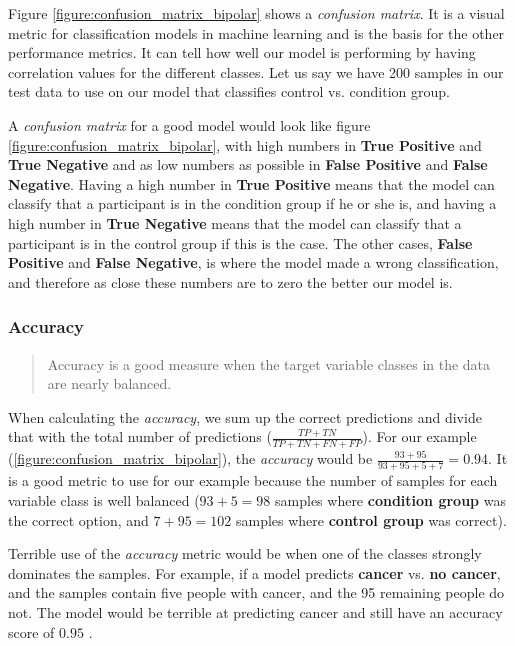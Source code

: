 Figure \ref{figure:confusion_matrix_bipolar} shows a \textit{confusion matrix}. It is a visual metric for classification models in machine learning and is the basis for the other performance metrics. It can tell how well our model is performing by having correlation values for the different classes. Let us say we have 200 samples in our test data to use on our model that classifies control vs. condition group. 

A \textit{confusion matrix} for a good model would look like figure \ref{figure:confusion_matrix_bipolar}, with high numbers in \textbf{True Positive} and \textbf{True Negative} and as low numbers as possible in \textbf{False Positive} and \textbf{False Negative}. Having a high number in \textbf{True Positive} means that the model can classify that a participant is in the condition group if he or she is, and having a high number in \textbf{True Negative} means that the model can classify that a participant is in the control group if this is the case. The other cases, \textbf{False Positive} and \textbf{False Negative}, is where the model made a wrong classification, and therefore as close these numbers are to zero the better our model is.

\subsubsection{Accuracy}

\blockquote[\cite{ml_metrics}]{Accuracy is a good measure when the target variable classes in the data are nearly balanced.}

When calculating the \textit{accuracy}, we sum up the correct predictions and divide that with the total number of predictions ($ \frac{TP + TN}{TP + TN + FN + FP} $). For our example (\ref{figure:confusion_matrix_bipolar}), the \textit{accuracy} would be $ \frac{93 + 95}{93 + 95 + 5 + 7} = 0.94 $. It is a good metric to use for our example because the number of samples for each variable class is well balanced ($ 93+5=98 $ samples where \textbf{condition group} was the correct option, and $ 7+95=102 $ samples where \textbf{control group} was correct).

Terrible use of the \textit{accuracy} metric would be when one of the classes strongly dominates the samples. For example, if a model predicts \textbf{cancer} vs. \textbf{no cancer}, and the samples contain five people with cancer, and the 95 remaining people do not. The model would be terrible at predicting cancer and still have an accuracy score of $ 0.95 $ \cite{ml_metrics}.

